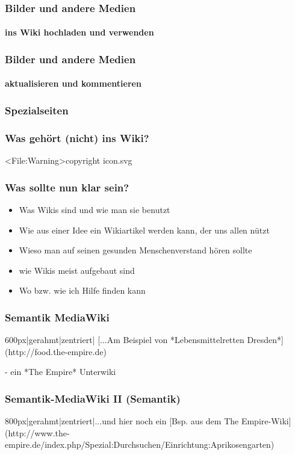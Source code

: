 \documentclass{beamer}
\begin{document}
\begin{frame}
  \frametitle{Bilder und andere Medien}
  \framesubtitle{ins Wiki hochladen und verwenden}

\end{frame}


\begin{frame}
  \frametitle{Bilder und andere Medien}
  \framesubtitle{aktualisieren und kommentieren}

\end{frame}


\begin{frame}
  \frametitle{Spezialseiten}

\end{frame}


\begin{frame}
  \frametitle{Was gehört (nicht) ins Wiki?}

  \textless File:Warning\textgreater  copyright icon.svg

\end{frame}

  
\begin{frame}
  \frametitle{Was sollte nun klar sein?}
  \begin{itemize}
    \item Was Wikis sind und wie man sie benutzt
    \item Wie aus einer Idee ein Wikiartikel werden kann, der uns allen nützt
    \item Wieso man auf seinen gesunden Menschenverstand hören sollte
    \item wie Wikis meist aufgebaut sind
    \item Wo bzw. wie ich Hilfe finden kann
  \end{itemize}
\end{frame}


\begin{frame}
  \frametitle{Semantik MediaWiki}

  600px|gerahmt|zentriert| [...Am Beispiel von *Lebensmittelretten Dresden*](http://food.the-empire.de)

   - ein *The Empire* Unterwiki
\end{frame}
  
\begin{frame}
  \frametitle{Semantik-MediaWiki II (Semantik)}

  800px|gerahmt|zentriert|...und hier noch ein [Bsp. aus dem The Empire-Wiki](http://www.the-empire.de/index.php/Spezial:Durchsuchen/Einrichtung:Aprikosengarten)

\end{frame}
\end{document}
